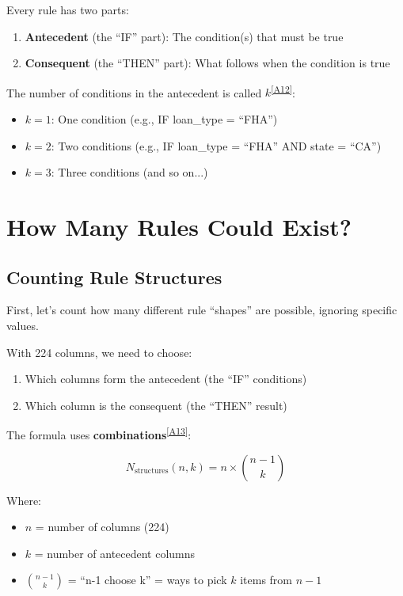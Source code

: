 \documentclass[11pt,a4paper]{article}
\newcommand{\term}[2]{\textcolor{termcolor}{\textbf{#1}}\textsuperscript{\hyperref[#2]{[#2]}}}
\begin{document}
Every rule has two parts:

\begin{enumerate}
    \item \textbf{Antecedent} (the ``IF'' part): The condition(s) that must be true
    \item \textbf{Consequent} (the ``THEN'' part): What follows when the condition is true
\end{enumerate}

The number of conditions in the antecedent is called \term{$k$}{A12}:
\begin{itemize}
    \item $k=1$: One condition (e.g., IF loan\_type = ``FHA'')
    \item $k=2$: Two conditions (e.g., IF loan\_type = ``FHA'' AND state = ``CA'')
    \item $k=3$: Three conditions (and so on...)
\end{itemize}

\section{How Many Rules Could Exist?}

\subsection{Counting Rule Structures}

First, let's count how many different rule ``shapes'' are possible, ignoring specific values.

With 224 columns, we need to choose:
\begin{enumerate}
    \item Which columns form the antecedent (the ``IF'' conditions)
    \item Which column is the consequent (the ``THEN'' result)
\end{enumerate}

The formula uses \term{combinations}{A13}:

\begin{equation}
N_{\text{structures}}(n, k) = n \times \binom{n-1}{k}
\end{equation}

Where:
\begin{itemize}
    \item $n$ = number of columns (224)
    \item $k$ = number of antecedent columns
    \item $\binom{n-1}{k}$ = ``n-1 choose k'' = ways to pick $k$ items from $n-1$
\end{itemize}
\end{document}
